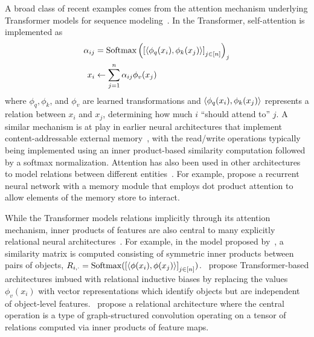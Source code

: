 A broad class of recent examples comes from the attention mechanism underlying Transformer models for sequence modeling~\parencite{vaswani2017attention}. In the Transformer, self-attention is implemented as
\begin{equation*}
    \begin{split}
        \alpha_{ij} &= \mathrm{Softmax}\left(\left[{\left \langle \phi_q(x_i), \phi_k(x_j) \right\rangle}\right]_{j \in [n]}\right)_j\\
        x_i &\gets \sum_{j=1}^{n} \alpha_{ij} \phi_v(x_j)
    \end{split}
\end{equation*}
where $\phi_q, \phi_k$, and $\phi_v$ are learned transformations and $\left \langle \phi_q(x_i), \phi_k(x_j) \right\rangle$ represents a relation between $x_i$ and $x_j$, determining how much $i$ ``should attend to'' $j$. A similar mechanism is at play in earlier neural architectures that implement content-addressable external memory~\parencite{gravesNeuralTuringMachines2014,gravesHybridComputingUsing2016a,pritzelNeuralEpisodicControl2017}, with the read/write operations typically being implemented using an inner product-based similarity computation followed by a softmax normalization. Attention has also been used in other architectures to model relations between different entities~\parencite{velickovicGraphAttentionNetworks2017a,santoroRelationalRecurrentNeural2018,zambaldiDeepReinforcementLearning2018a,locatelloObjectCentricLearningSlot2020b}. For example, \citet{santoroRelationalRecurrentNeural2018} propose a recurrent neural network with a memory module that employs dot product attention to allow elements of the memory store to interact.

While the Transformer models relations implicitly through its attention mechanism, inner products of features are also central to many explicitly relational neural architectures~\parencite[e.g.,][]{webbEmergentSymbols2021,kergNeuralArchitecture2022,altabaaRelationalConvolutionalNetworks2023,altabaaAbstractorsRelationalCrossattention2024,altabaa2024disentanglingintegratingrelationalsensory}. For example, in the model proposed by~\citet{kergNeuralArchitecture2022}, a similarity matrix is computed consisting of symmetric inner products between pairs of objects, $R_{i,\cdot} = \mathrm{Softmax}(\left[\left \langle \phi(x_i), \phi(x_j) \right\rangle\right]_{j\in[n]})$.~\citet{altabaaAbstractorsRelationalCrossattention2024,altabaa2024disentanglingintegratingrelationalsensory} propose Transformer-based architectures imbued with relational inductive biases by replacing the values $\phi_v(x_i)$ with vector representations which identify objects but are independent of object-level features.~\citet{altabaaRelationalConvolutionalNetworks2023} propose a relational architecture where the central operation is a type of graph-structured convolution operating on a tensor of relations computed via inner products of feature maps.


